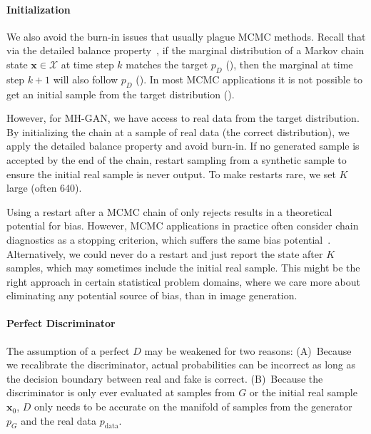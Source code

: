 \documentclass{article}
\renewcommand{\vec}[1]{{\boldsymbol{\mathbf{#1}}}} %
\newcommand{\set}[1]{\mathcal{#1}}
\newcommand{\sample}{\sim}
\newcommand{\PG}{{p_G}}
\newcommand{\PD}{{p_D}}
\newcommand{\PR}{{p_{\textrm{data}}}}
\newcommand{\setx}{\set{X}}
\begin{document}
\paragraph{Initialization}
We also avoid the burn-in issues that usually plague MCMC methods.
Recall that via the detailed balance property~\citep[Ch.~1]{Gilks1996}, if the marginal distribution of a Markov chain state $\vec x \in \setx$ at time step $k$ matches the target $\PD$ (\smash{$\vec x_k \sample \PD$}), then the marginal at time step $k+1$ will also follow $\PD$ (\smash{$\vec x_{k+1} \sample \PD$})\@.
In most MCMC applications it is not possible to get an initial sample from the target distribution (\smash{$\vec x_0 \sample \PD$})\@.

However, for MH-GAN, we have access to real data from the target distribution.
By initializing the chain at a sample of real data (the correct distribution), we apply the detailed balance property and avoid burn-in.
If no generated sample is accepted by the end of the chain, restart sampling from a synthetic sample to ensure the initial real sample is never output.
To make restarts rare, we set $K$ large (often 640)\@.

Using a restart after a MCMC chain of only rejects results in a theoretical potential for bias.
However, MCMC applications in practice often consider chain diagnostics as a stopping criterion, which suffers the same bias potential~\citep{Cowles1999}.
Alternatively, we could never do a restart and just report the state after $K$ samples, which may sometimes include the initial real sample.
This might be the right approach in certain statistical problem domains, where we care more about eliminating any potential source of bias, than in image generation.

\paragraph{Perfect Discriminator}
The assumption of a perfect $D$ may be weakened for two reasons:
(A)~Because we recalibrate the discriminator, actual probabilities can be incorrect as long as the decision boundary between real and fake is correct.
(B)~Because the discriminator is only ever evaluated at samples from $G$ or the initial real sample $\vec x_0$, $D$ only needs to be accurate on the manifold of samples from the generator $\PG$ and the real data $\PR$.


\end{document}

